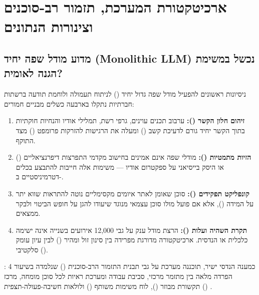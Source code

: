 \chapter{ארכיטקטורת המערכת, תזמור רב-סוכנים וצינורות הנתונים}
\label{ch:architecture}

\section{מדוע מודל שפה יחיד (Monolithic LLM) נכשל במשימת הגנה לאומית?}
ניסיונות ראשונים להפעיל מודל שפה גדול יחיד () לניתוח תעמולה ולוחמת תודעה ברשתות חברתיות נתקלו בארבעה כשלים מבניים חמורים:
\begin{enumerate}
    \item \textbf{זיהום חלון הקשר ():} ערבוב תכנים עוינים, גרפי רשת, תמלילי אודיו והנחיות חוקתיות בתוך הקשר יחיד גורם לדעיכת קשב () ומעלה את הרגישות להזרקות פרומפט () מצד התוקף.
    \item \textbf{הזיות מתמטיות ():} מודלי שפה אינם אמינים בחישוב מקדמי התפרצות דיפרנציאליים () או היסק בייסיאני על ספקטרום אודיו — משימות אלה חייבות להתבצע בכלים דטרמיניסטיים ב-.
    \item \textbf{קונפליקט תפקידים ():} סוכן שאומן לאתר איומים מקסימליים נוטה להתראות שווא יתר על המידה (), אלא אם פועל מולו סוכן עצמאי מנוגד שיעודו להגן על חופש הביטוי ולבקר ממצאים.
    \item \textbf{תקרת השהיה ועלות ():} הרצת מודל ענק על גבי 12,000 אירועים בשנייה אינה ישימה כלכלית או הנדסית. ארכיטקטורה מדורגת מפרידה בין סינון זול ומהיר () לבין עיון עומק סלקטיבי ().
\end{enumerate}

כמענה הנדסי ישיר, תוכננה מערכת  על גבי תבנית התזמור הרב-סוכנית () שנלמדה בשיעור 4 \cite{segal2026l04}: הפרדה מלאה בין מתזמר מרכזי, סביבת עבודה ומערכת ראיות לכל סוכן מומחה, מרכז תקשורת מבוזר (), לוח משימות משותף () ולולאות חשיבה-פעולה-תצפית () \cite{yao2022react, wu2023autogen}.

